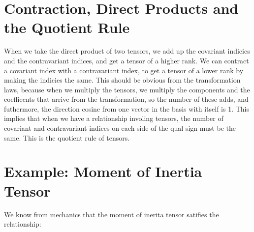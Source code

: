 \documentclass[11pt,notitlepage]{article}
\begin{document}
\section{Contraction, Direct Products and the Quotient Rule}
When we take the direct product of two tensors, we add up the covariant indicies and the contravariant indices, and get a tensor of a higher rank. We can contract a covariant index with a contravariant index, to get a tensor of a lower rank by making the indicies the same. This should be obvious from the transformation laws, because when we multiply the tensors, we multiply the components and the coeffiecnts that arrive from the transformation, so the number of these adds, and futhermore, the direction cosine from one vector in the basis with itself is 1. 
This implies that when we have a relationship involing tensors, the number of covariant and contravariant indices on each side of the qual sign must be the same. This is the quotient rule of tensors.
\section{Example: Moment of Inertia Tensor}
We know from mechanics that the moment of inerita tensor satifies the relationship:
$$ 
\end{document}
